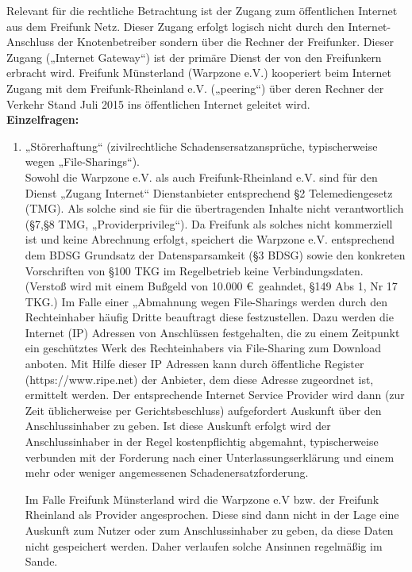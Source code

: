 \documentclass{article}
\begin{document}
Relevant für die rechtliche Betrachtung ist der Zugang zum öffentlichen Internet aus dem Freifunk Netz. Dieser Zugang erfolgt logisch nicht durch den Internet-Anschluss der Knotenbetreiber sondern über die Rechner der Freifunker. Dieser Zugang („Internet Gateway“) ist der primäre Dienst der von den Freifunkern erbracht wird. Freifunk  Münsterland (Warpzone e.V.) kooperiert beim Internet Zugang mit dem Freifunk-Rheinland e.V. („peering“)  über deren Rechner der Verkehr Stand Juli 2015 ins öffentlichen Internet geleitet wird.\bigskip\\

\textbf{Einzelfragen:}

\begin{enumerate}\item  „Störerhaftung“ (zivilrechtliche Schadensersatzansprüche, typischerweise wegen „File-Sharings“).\\
Sowohl die Warpzone e.V. als auch Freifunk-Rheinland e.V. sind für den Dienst „Zugang Internet“ Dienstanbieter entsprechend §2 Telemediengesetz (TMG).  Als solche sind sie für die übertragenden Inhalte nicht verantwortlich (§7,§8 TMG, „Providerprivileg“). Da Freifunk als solches nicht kommerziell ist und keine Abrechnung erfolgt, speichert die Warpzone e.V. entsprechend dem BDSG Grundsatz der Datensparsamkeit (§3 BDSG) sowie den konkreten Vorschriften von §100 TKG im Regelbetrieb keine Verbindungsdaten. (Verstoß wird mit einem Bußgeld von 10.000 \euro\ geahndet, §149 Abs 1, Nr 17 TKG.) Im Falle einer „Abmahnung wegen File-Sharings werden durch den Rechteinhaber  häufig Dritte beauftragt diese festzustellen. Dazu werden die Internet (IP) Adressen von Anschlüssen festgehalten, die zu einem Zeitpunkt ein geschütztes Werk des Rechteinhabers via File-Sharing zum Download anboten. Mit Hilfe dieser IP Adressen kann durch öffentliche Register (https://www.ripe.net) der Anbieter, dem diese Adresse zugeordnet ist, ermittelt werden. Der entsprechende   Internet Service Provider wird dann (zur Zeit üblicherweise per Gerichtsbeschluss) aufgefordert  Auskunft über den Anschlussinhaber zu geben. Ist diese Auskunft erfolgt wird der Anschlussinhaber in der Regel kostenpflichtig abgemahnt, typischerweise verbunden mit der Forderung nach einer Unterlassungserklärung und einem mehr oder weniger angemessenen Schadenersatzforderung.

Im Falle Freifunk Münsterland wird die Warpzone e.V bzw. der Freifunk Rheinland als Provider angesprochen. Diese sind dann nicht in der Lage eine Auskunft zum Nutzer oder zum Anschlussinhaber zu geben, da diese Daten nicht gespeichert werden. Daher verlaufen solche Ansinnen regelmäßig im Sande.


\end{enumerate}
\end{document}
